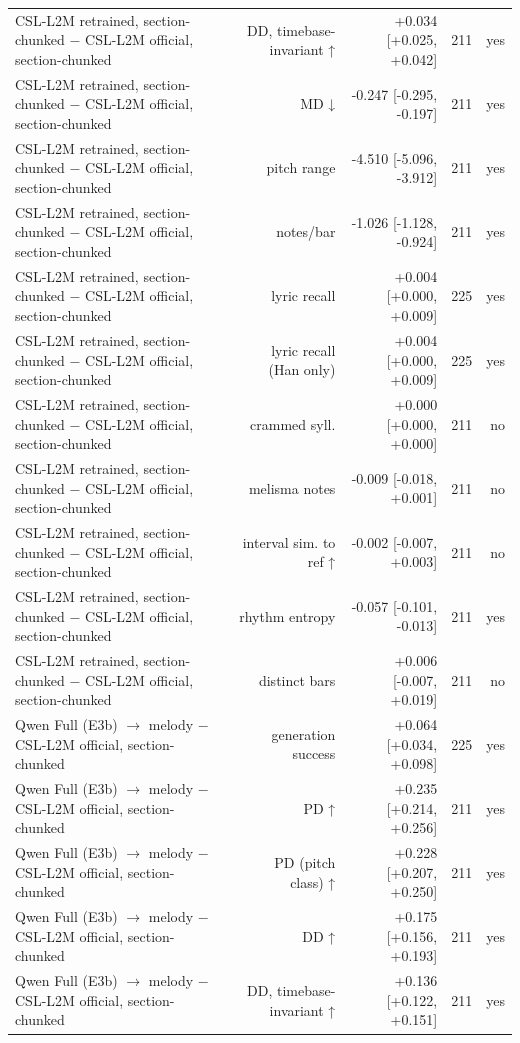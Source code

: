 \begin{table}[t]
\begin{tabular}{lrrrr}
CSL-L2M retrained, section-chunked $-$ CSL-L2M official, section-chunked & DD, timebase-invariant ↑ & +0.034 [+0.025, +0.042] & 211 & yes \\
CSL-L2M retrained, section-chunked $-$ CSL-L2M official, section-chunked & MD ↓ & -0.247 [-0.295, -0.197] & 211 & yes \\
CSL-L2M retrained, section-chunked $-$ CSL-L2M official, section-chunked & pitch range & -4.510 [-5.096, -3.912] & 211 & yes \\
CSL-L2M retrained, section-chunked $-$ CSL-L2M official, section-chunked & notes/bar & -1.026 [-1.128, -0.924] & 211 & yes \\
CSL-L2M retrained, section-chunked $-$ CSL-L2M official, section-chunked & lyric recall & +0.004 [+0.000, +0.009] & 225 & yes \\
CSL-L2M retrained, section-chunked $-$ CSL-L2M official, section-chunked & lyric recall (Han only) & +0.004 [+0.000, +0.009] & 225 & yes \\
CSL-L2M retrained, section-chunked $-$ CSL-L2M official, section-chunked & crammed syll. & +0.000 [+0.000, +0.000] & 211 & no \\
CSL-L2M retrained, section-chunked $-$ CSL-L2M official, section-chunked & melisma notes & -0.009 [-0.018, +0.001] & 211 & no \\
CSL-L2M retrained, section-chunked $-$ CSL-L2M official, section-chunked & interval sim. to ref ↑ & -0.002 [-0.007, +0.003] & 211 & no \\
CSL-L2M retrained, section-chunked $-$ CSL-L2M official, section-chunked & rhythm entropy & -0.057 [-0.101, -0.013] & 211 & yes \\
CSL-L2M retrained, section-chunked $-$ CSL-L2M official, section-chunked & distinct bars & +0.006 [-0.007, +0.019] & 211 & no \\
Qwen Full (E3b) $\rightarrow$ melody $-$ CSL-L2M official, section-chunked & generation success & +0.064 [+0.034, +0.098] & 225 & yes \\
Qwen Full (E3b) $\rightarrow$ melody $-$ CSL-L2M official, section-chunked & PD ↑ & +0.235 [+0.214, +0.256] & 211 & yes \\
Qwen Full (E3b) $\rightarrow$ melody $-$ CSL-L2M official, section-chunked & PD (pitch class) ↑ & +0.228 [+0.207, +0.250] & 211 & yes \\
Qwen Full (E3b) $\rightarrow$ melody $-$ CSL-L2M official, section-chunked & DD ↑ & +0.175 [+0.156, +0.193] & 211 & yes \\
Qwen Full (E3b) $\rightarrow$ melody $-$ CSL-L2M official, section-chunked & DD, timebase-invariant ↑ & +0.136 [+0.122, +0.151] & 211 & yes \\

\end{tabular}
\end{table}
